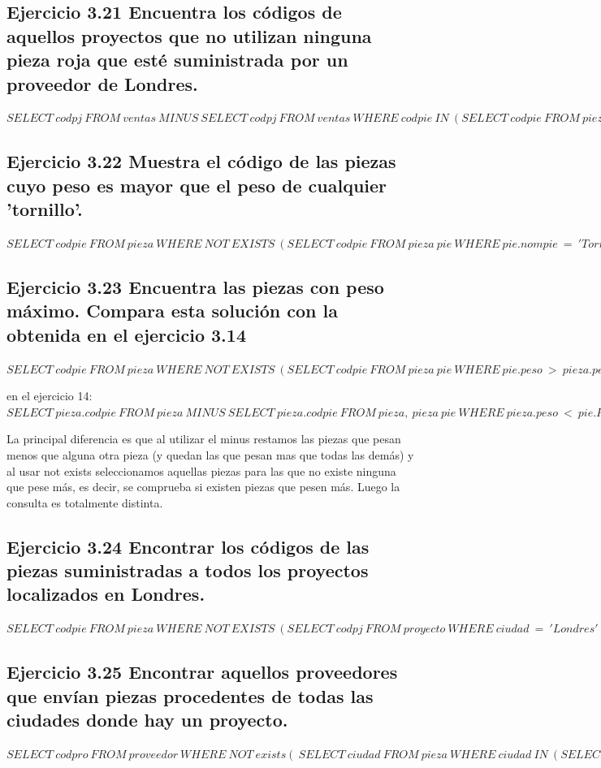 \documentclass[a4paper, 11pt]{article}
\begin{document}
\subsection{Ejercicio 3.21 Encuentra los códigos de aquellos proyectos que no utilizan ninguna pieza
	roja que esté suministrada por un proveedor de Londres.}

$SELECT\ codpj\ FROM\ ventas\ MINUS\ SELECT\ codpj\ FROM\ ventas\ WHERE\ codpie\ IN\ (SELECT\ codpie\ FROM\ pieza\ NATURAL\ JOIN\ VENTAS\ WHERE\ color\ =\ 'Rojo'\ AND\ codpro\ IN\ (SELECT\ codpro\ FROM\ PROVEEDOR\ WHERE\ ciudad\ =\ 'Londres'))$

\subsection{Ejercicio 3.22 Muestra el código de las piezas cuyo peso es mayor que el peso de cualquier
	’tornillo’.}
$SELECT\ codpie\ FROM\ pieza\ WHERE\ NOT\ EXISTS\ (SELECT\ codpie\ FROM\ pieza\ pie\ WHERE\ pie.nompie\ =\ 'Tornillo'\ AND\ pie.peso\ >\ pieza.peso)$

\subsection{Ejercicio 3.23 Encuentra las piezas con peso máximo. Compara esta solución con la obtenida
	en el ejercicio 3.14}

$SELECT\ codpie\ FROM\ pieza\ WHERE\ NOT\ EXISTS\ (SELECT\ codpie\ FROM\ pieza\ pie\ WHERE\ pie.peso\ >\ pieza.peso)$

en el ejercicio 14: $SELECT\ pieza.codpie\ FROM\ pieza\ MINUS\ SELECT\ pieza.codpie\ FROM\ pieza,\ pieza\ pie\ WHERE\ pieza.peso\ <\ pie.PESO$

La principal diferencia es que al utilizar el minus restamos las piezas que pesan menos que alguna otra pieza (y quedan las que pesan mas que todas las demás) y al usar not exists seleccionamos aquellas piezas para las que no existe ninguna que pese más, es decir, se comprueba si existen piezas que pesen más. Luego la consulta es totalmente distinta.

\subsection{Ejercicio 3.24 Encontrar los códigos de las piezas suministradas a todos los proyectos
	localizados en Londres.}
$SELECT\ codpie\ FROM\ pieza\ WHERE\ NOT\ EXISTS\ (SELECT\ codpj\ FROM\ proyecto\ WHERE\ ciudad\ =\ 'Londres'\ AND\ NOT\ EXISTS\ (SELECT\ *\ FROM\ ventas\ WHERE\ pieza.codpie\ =\ ventas.codpie\ AND\ proyecto.codpj\ =\ ventas.codpj))$

\subsection{Ejercicio 3.25 Encontrar aquellos proveedores que envían piezas procedentes de todas las
	ciudades donde hay un proyecto.}$
SELECT\ codpro\ FROM\ proveedor\ WHERE\ NOT\ exists(
\ SELECT\ ciudad\ FROM\ pieza\ WHERE\ ciudad\ IN\ (SELECT\ DISTINCT\ ciudad\ FROM\ proyecto)\ AND\ NOT\ exists(
\ SELECT\ *\ FROM\ ventas\ WHERE\ proveedor.codpro\ =\ ventas.codpro\ AND\ pieza.codpie\ =\ ventas.codpie)
\ )
$
\end{document}
